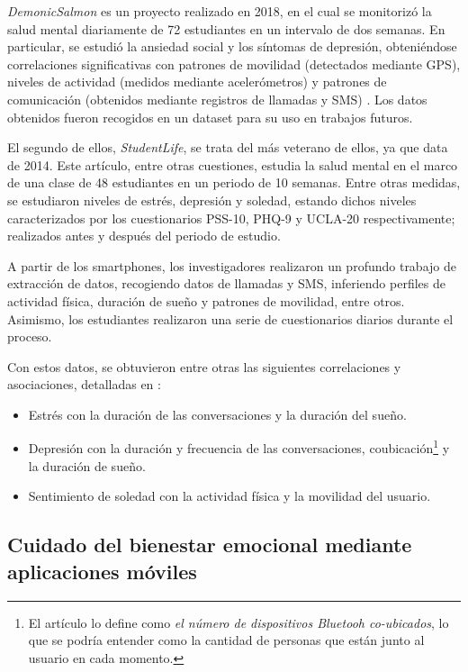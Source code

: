         \textit{DemonicSalmon} es un proyecto realizado en 2018, en el cual se monitorizó la salud mental diariamente de 72 estudiantes en un intervalo de dos semanas. En particular, se estudió la ansiedad social y los síntomas de depresión, obteniéndose correlaciones significativas con patrones de movilidad (detectados mediante GPS), niveles de actividad (medidos mediante acelerómetros) y patrones de comunicación (obtenidos mediante registros de llamadas y SMS) \cite{boukhechba_demonicsalmon_2018}. Los datos obtenidos fueron recogidos en un \gls{dataset} para su uso en trabajos futuros.

        El segundo de ellos, \textit{StudentLife}, se trata del más veterano de ellos, ya que data de 2014. Este artículo, entre otras cuestiones, estudia la salud mental en el marco de una clase de 48 estudiantes en un periodo de 10 semanas. Entre otras medidas, se estudiaron niveles de estrés, depresión y soledad, estando dichos niveles caracterizados por los cuestionarios PSS-10, PHQ-9 y UCLA-20 respectivamente; realizados antes y después del periodo de estudio.
        
        A partir de los \glspl{smartphone}, los investigadores realizaron un profundo trabajo de extracción de datos, recogiendo datos de llamadas y SMS, inferiendo perfiles de actividad física, duración de sueño y patrones de movilidad, entre otros. Asimismo, los estudiantes realizaron una serie de cuestionarios diarios durante el proceso.

        Con estos datos, se obtuvieron entre otras las siguientes correlaciones y asociaciones, detalladas en \cite{rui_studentlife_2014}:

        \begin{itemize}
            \item Estrés con la duración de las conversaciones y la duración del sueño.
            \item Depresión con la duración y frecuencia de las conversaciones, coubicación\footnote{El artículo lo define como \textit{el número de dispositivos Bluetooh co-ubicados}, lo que se podría entender como la cantidad de personas que están junto al usuario en cada momento.} y la duración de sueño.
            \item Sentimiento de soledad con la actividad física y la movilidad del usuario.
        \end{itemize}
    
    \subsection{Cuidado del bienestar emocional mediante aplicaciones móviles}
        \label{sec:estado_arte:apps}

